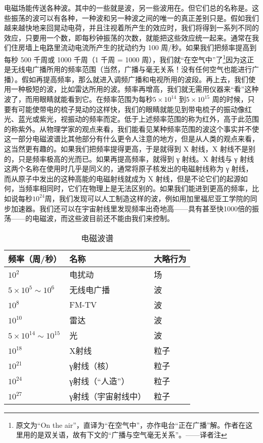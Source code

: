 \documentclass[12pt,oneside]{book}
\begin{document}
\begin{common-format}
电磁场能传送各种波。其中的一些就是波，另一些波用在。但它们总的名称是。这些振荡的波可以有各种，一种波和另一种波之间的唯一的真正差别只是。假如我们越来越快地来回晃动电荷，并且注视着所产生的效应时，我们将得到一系列不同的效应，只要用一个数，即每秒钟振荡的次数，就能把这些效应统一起来。通常在我们住房墙上电路里流动电流所产生的扰动约为 100 周/秒。如果我们把频率提高到每秒 500 千周或 1000 千周（1 千周 = 1000 周），我们就“在空气中”了\footnote{原文为“On the air”，直译为“在空气中”，亦作电台“正在广播”解。作者在这里用的是双关语，故有下文的“广播与空气毫无关系”。——译者注}因为这正是无线电广播所用的频率范围（当然，广播与毫无关系！没有任何空气也能进行广播）。假如再提高频率，那么就进入调频广播和电视所用的波段。再上去，我们使用一种极短的波，比如雷达所用的波。频率再增高，我们就无需用仪器来“看”这种波了，而用眼睛就能看到它。在频率范围为每秒$ 5\times10^{14} $  到$ 5\times10^{15}  $ 周的时候，只要有可能使带电的梳子晃动的这样快，我们的眼睛就能见到带电梳子的振动像红光、蓝光或紫光，视振动的频率而定。低于上述频率范围的称为红外，高于此范围的称紫外。从物理学家的观点来看，我们能看见某种频率范围的波这个事实并不使这一部分电磁波谱比其他部分有什么更令人注意的地方，但是从人类的观点来看，这当然更有趣的。如果我们把频率提得更高，于是就得到 X 射线，X 射线不是别的，只是频率极高的光而已。如果再提高频率，就得到 γ 射线。X 射线与 γ 射线这两个名称在使用时几乎是同义的，通常将原子核发出的电磁射线称为 γ 射线，而从原子中发出的这种高能的电磁射线就成为 X 射线，但是不论它们的起源如何，当频率相同时，它们在物理上是无法区别的。如果我们能进到更高的频率，比如说每秒$10^{24}$周，我们发现可以人工制造这样的波，例如用加里福尼亚工学院的同步加速器。我们还可以在宇宙射线里发现频率出奇地高——具有甚至快1000倍的振荡——的电磁波，而这些波目前还不能由我们来控制。
\begin{table}[H]
\centering
\label{tab:电磁波谱}
\caption{电磁波谱}
\medskip 
\begin{tabular}{@{}lll@{}}
\toprule
频率（周/秒）                     & 名称         & 大略行为 \\ \midrule
$10^{2}$                    & 电扰动        & 场    \\
$5\times10^{5}\sim10^{6}$   & 无线电广播      & 波    \\
$10^{8}$                    & FM-TV      & 波    \\
$10^{10}$                   & 雷达         & 波    \\
$5\times10^{14}\sim10^{15}$ & 光          & 波    \\
$10^{18}$                   & X射线        & 粒子   \\
$10^{21}$                   & γ射线（核）     & 粒子   \\
$10^{24}$                   & γ射线（“人造”）  & 粒子   \\
$10^{27}$                   & γ射线（宇宙射线中） & 粒子  \\ \bottomrule
\end{tabular}
\end{table}



\end{common-format}
\end{document}

